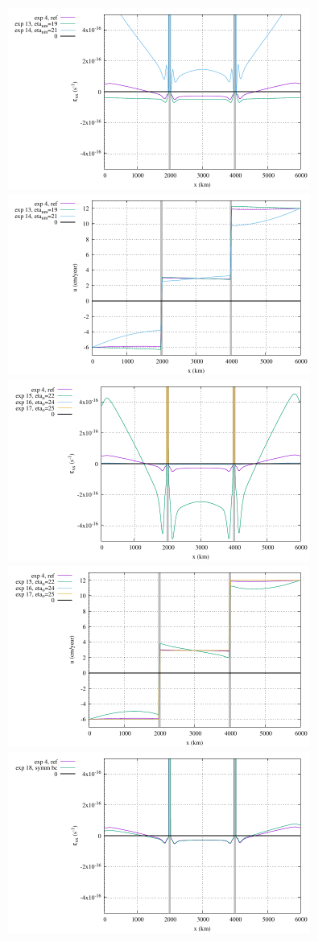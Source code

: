 \begin{center}
\includegraphics[width=8cm]{python_codes/fieldstone_148/results/fig3_exx_surface}
\includegraphics[width=8cm]{python_codes/fieldstone_148/results/fig3_u_surface}\\
\includegraphics[width=8cm]{python_codes/fieldstone_148/results/fig4_exx_surface}
\includegraphics[width=8cm]{python_codes/fieldstone_148/results/fig4_u_surface}\\
\includegraphics[width=8cm]{python_codes/fieldstone_148/results/fig5_exx_surface}

\end{center}
